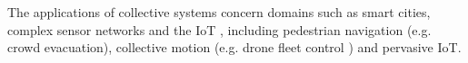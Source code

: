 The applications of collective systems concern domains such as smart cities,
complex sensor networks and the \ac{IoT} \cite{CAS-AggregateComputingBlocks},
including pedestrian navigation (e.g. crowd evacuation), collective motion
(e.g. drone fleet control \cite{CollectiveMotion-Quadcopter}) and pervasive
\ac{IoT}.